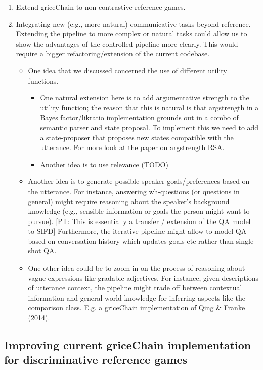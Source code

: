 \documentclass[fleqn,reqno,10pt]{article}
\newcommand{\pt}[1]{\textcolor{CSP-accent-1}{[PT: #1]}}
\begin{document}
\begin{enumerate}
  \item Extend griceChain to non-contrastive reference games.
  \item Integrating new (e.g., more natural) communicative tasks beyond reference. Extending the pipeline to more complex or natural tasks could allow us to show the advantages of the controlled pipeline more clearly. This would require a bigger refactoring/extension of the current codebase.
  \begin{itemize}
    \item One idea that we discussed concerned the use of different utility functions.
    \begin{itemize}
      \item One natural extension here is to add argumentative strength to the utility function; the reason that this is natural is that argstrength in a Bayes factor/likratio implementation grounds out in a combo of semantic parser and state proposal. To implement this we need to add a state-proposer that proposes new states compatible with the utterance. For more look at the paper on argstrength RSA.
      \item Another idea is to use relevance (TODO)
    \end{itemize}
    \item Another idea is to generate possible speaker goals/preferences based on the utterance. For instance, answering wh-questions (or questions in general) might require reasoning about the speaker's background knowledge (e.g., sensible information or goals the person might want to pursue). \pt{This is essentially a transfer / extension of the QA model to SIFD} Furthermore, the iterative pipeline might allow to model QA based on conversation history which updates goals etc rather than single-shot QA.
    \item One other idea could be to zoom in on the process of reasoning about vague expressions like gradable adjectives. For instance, given descriptions of utterance context, the pipeline might trade off between contextual information and general world knowledge for inferring aspects like the comparison class. E.g. a griceChain implementation of Qing \& Franke (2014).
  \end{itemize}
\end{enumerate}

\subsection{Improving current griceChain implementation for discriminative reference games}
\end{document}
